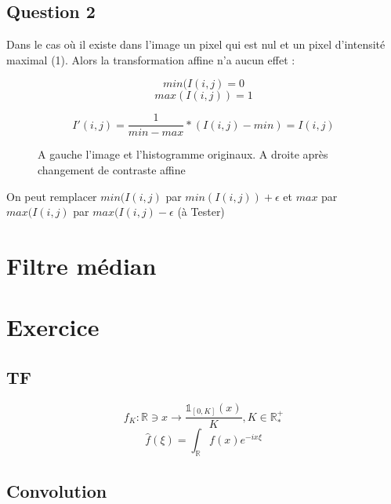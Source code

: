 \documentclass{article}
\begin{document}
\subsection*{Question 2}

Dans le cas où il existe dans l'image un pixel qui est nul et un pixel d'intensité maximal (1). Alors la transformation affine n'a aucun effet : 


$$min(I(i,j) = 0$$
$$max(I(i,j)) = 1$$
	
$$I'(i,j) = \frac{1}{min-max} * (I(i,j) - min) = I(i,j)$$


\begin{figure}[h]
		
	\caption{A gauche l'image et l'histogramme originaux. A droite après changement de contraste affine}
	
\end{figure}


On peut remplacer $min(I(i,j)$ par $min(I(i,j)) + \epsilon$ et $max$ par $max(I(i,j)$ par $max(I(i,j) - \epsilon$ (à Tester)


\section{Filtre médian}

\section{Exercice}
\subsection{TF}
$$ f_K : \mathbb{R} \ni x \rightarrow \frac{\mathds{1}_{[0, K]}(x)}{K}, K \in \mathbb{R}_*^+ $$
$$ \hat{f}(\xi) = \int_\mathbb{R} f(x) e^{-ix\xi}$$
\subsection{Convolution}
\end{document}
